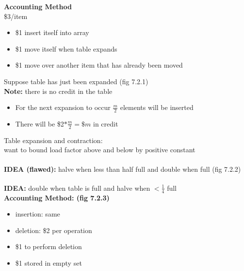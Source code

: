 \documentclass{article}
\begin{document}
	\textbf{Accounting Method\\}
	\$3/item
	\begin{itemize}
		\item \$1 insert itself into array
		\item \$1 move itself when table expands
		\item \$1 move over another item that has already been moved\\
	\end{itemize}
	Suppose table has just been expanded (fig 7.2.1)\\
	\textbf{Note:} there is no credit in the table\\
	\begin{itemize}
		\item For the next expansion to occur $\frac{m}{2}$ elements will be inserted
		\item There will be \$2$*\frac{m}{2} = \$m$ in credit\\
	\end{itemize}
	Table expansion and contraction:\\
	want to bound load factor above and below by positive constant\\\\
	\textbf{IDEA (flawed):} halve when less than half full and double when full (fig 7.2.2)\\\\
	\textbf{IDEA:} double when table is full and halve when $<\frac{1}{4}$ full\\
	\textbf{Accounting Method: (fig 7.2.3)}
	\begin{itemize}
		\item insertion: same
		\item deletion: \$2 per operation
		\item \$1 to perform deletion
		\item \$1 stored in empty set
	\end{itemize}
	
\end{document}
